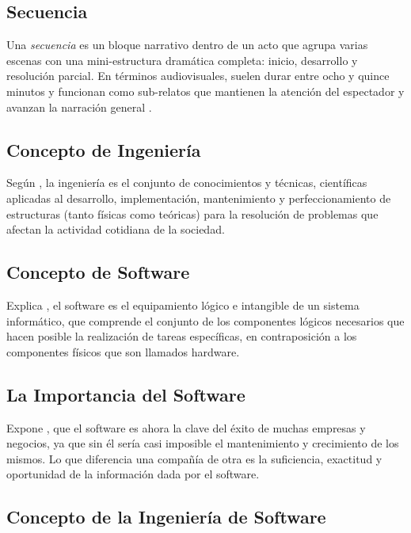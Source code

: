 \documentclass[12pt]{article}
\begin{document}
	\subsection{Secuencia}

	Una \textit{secuencia} es un bloque narrativo dentro de un acto que agrupa varias escenas con una mini-estructura dramática completa: inicio, desarrollo y resolución parcial. En términos audiovisuales, suelen durar entre ocho y quince minutos y funcionan como sub-relatos que mantienen la atención del espectador y avanzan la narración general \parencite{gulino_sequence,cambridge_sequence}.

	\subsection{Concepto de Ingeniería}

	Según \textcite{maida_metodologias_2015}, la ingeniería es el conjunto de conocimientos y técnicas, científicas aplicadas al desarrollo,
	implementación, mantenimiento y perfeccionamiento de estructuras (tanto físicas como teóricas)
	para la resolución de problemas que afectan la actividad cotidiana de la sociedad.

	\subsection{Concepto de Software}

	Explica \textcite{maida_metodologias_2015}, el software es el equipamiento lógico e intangible de un sistema informático, que comprende el conjunto de los componentes lógicos necesarios que hacen posible la realización de tareas específicas,
	en contraposición a los componentes físicos que son llamados hardware.

	\subsection{La Importancia del Software}

	Expone \textcite{maida_metodologias_2015}, que el software es ahora la clave del éxito de muchas empresas y negocios, ya que sin él sería casi imposible el mantenimiento y crecimiento de los mismos. Lo que diferencia una compañía de otra es la suficiencia, exactitud y oportunidad de la información dada por el software.

	\subsection{Concepto de la Ingeniería de Software}
\end{document}
